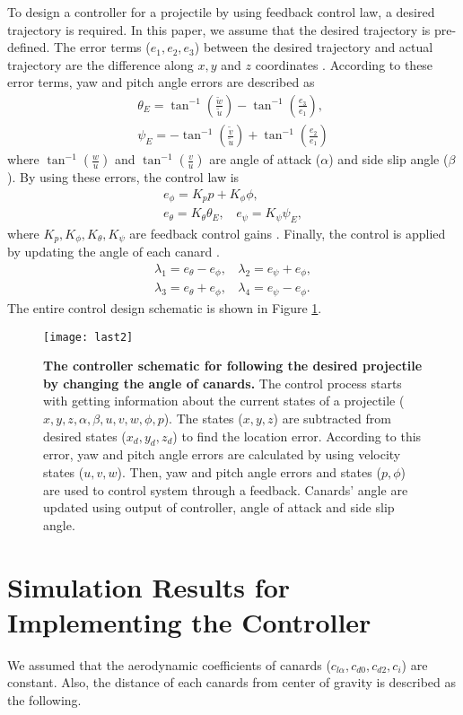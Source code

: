 \documentclass[letterpaper, 10 pt, conference]{ieeeconf}  %
\begin{document}
To design a controller for a projectile by using feedback control law, a desired trajectory is required. In this paper, we assume that the desired trajectory is pre-defined. The error terms ($e_1, e_2, e_3$) between the desired trajectory and actual trajectory are the difference along $x, y$ and $z$ coordinates \cite{costel97pot}. According to these error terms, yaw and pitch angle errors are described as 
\begin{gather}
\theta_{E}=\tan^{-1}(\frac{\tilde{w}}{\tilde{u}})-\tan^{-1}(\frac{e_3}{e_1}), \\
\psi_{E}=-\tan^{-1}(\frac{\tilde{v}}{\tilde{u}})+\tan^{-1}(\frac{e_2}{e_1})
\end{gather}
where $\tan^{-1}(\frac{w}{u})$ and $\tan^{-1}(\frac{v}{u})$ are angle of attack ($\alpha$) and side slip angle ($\beta$).
By using these errors, the control law is 
\begin{gather}
e_{\phi}=K_p p + K_{\phi} \phi, \\
e_{\theta}=K_{\theta} \theta_E, \ \ \ \
e_{\psi}=K_{\psi} \psi_E,
\end{gather}
where $K_p, K_{\phi}, K_{\theta}, K_{\psi}$ are feedback control gains \cite{costel97pot}. Finally, the control is applied by updating the angle of each canard \cite{costel97pot}.
\begin{gather}
\lambda_1=e_{\theta}-e_{\phi}, \ \ \ \
\lambda_2=e_{\psi}+e_{\phi}, \\
\lambda_3=e_{\theta}+e_{\phi}, \ \ \ \
\lambda_4=e_{\psi}-e_{\phi}.
\end{gather}
The entire control design schematic is shown in Figure \ref{fig:cont}.
\begin{figure}[!t]
\centering
\texttt{[image: last2]}
\caption{\textbf{The controller schematic for following the desired projectile by changing the angle of canards.} The control process starts with getting information about the current states of a projectile ($x, y, z, \alpha, \beta, u, v, w, \phi, p$). The states ($x, y, z$) are subtracted from desired states ($x_d, y_d, z_d$) to find the location error. According to this error, yaw and pitch angle errors are calculated by using velocity states ($u, v, w$). Then, yaw and pitch angle errors and states ($p, \phi$) are used to control system through a feedback. Canards' angle are updated using output of controller, angle of attack and side slip angle.}
\label{fig:cont}
\end{figure}


\section{Simulation Results for Implementing the Controller}
We assumed that the aerodynamic coefficients of canards ($c_{l \alpha}, c_{d 0}, c_{d2}, c_i$) are constant. Also, the distance of each canards from center of gravity is described as the following.
\end{document}
